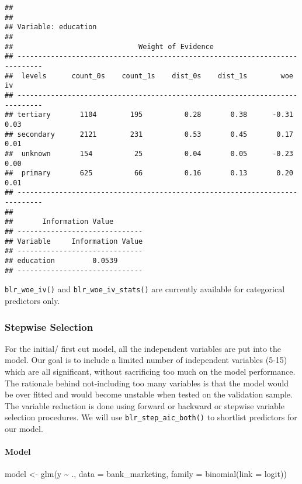 \documentclass[
]{article}
\newenvironment{Shaded}{\begin{snugshade}}{\end{snugshade}}
\newcommand{\AttributeTok}[1]{\textcolor[rgb]{0.77,0.63,0.00}{#1}}
\newcommand{\FunctionTok}[1]{\textcolor[rgb]{0.00,0.00,0.00}{#1}}
\newcommand{\NormalTok}[1]{#1}
\newcommand{\OtherTok}[1]{\textcolor[rgb]{0.56,0.35,0.01}{#1}}
\newcommand{\SpecialCharTok}[1]{\textcolor[rgb]{0.00,0.00,0.00}{#1}}
\newcommand{\StringTok}[1]{\textcolor[rgb]{0.31,0.60,0.02}{#1}}
\begin{document}
\begin{verbatim}
## 
## 
## Variable: education
## 
##                              Weight of Evidence                              
## ----------------------------------------------------------------------------
##  levels      count_0s    count_1s    dist_0s    dist_1s        woe      iv   
## ----------------------------------------------------------------------------
## tertiary       1104        195          0.28       0.38      -0.31     0.03  
## secondary      2121        231          0.53       0.45       0.17     0.01  
##  unknown       154          25          0.04       0.05      -0.23     0.00  
##  primary       625          66          0.16       0.13       0.20     0.01  
## ----------------------------------------------------------------------------
## 
##       Information Value        
## ------------------------------
## Variable     Information Value 
## ------------------------------
## education         0.0539       
## ------------------------------
\end{verbatim}

\texttt{blr\_woe\_iv()} and \texttt{blr\_woe\_iv\_stats()} are currently
available for categorical predictors only.

\hypertarget{stepwise-selection}{%
\subsubsection{Stepwise Selection}\label{stepwise-selection}}

For the initial/ first cut model, all the independent variables are put
into the model. Our goal is to include a limited number of independent
variables (5-15) which are all significant, without sacrificing too much
on the model performance. The rationale behind not-including too many
variables is that the model would be over fitted and would become
unstable when tested on the validation sample. The variable reduction is
done using forward or backward or stepwise variable selection
procedures. We will use \texttt{blr\_step\_aic\_both()} to shortlist
predictors for our model.

\hypertarget{model}{%
\paragraph{Model}\label{model}}

\begin{Shaded}
\begin{Highlighting}[]
\NormalTok{model }\OtherTok{\textless{}{-}} \FunctionTok{glm}\NormalTok{(y }\SpecialCharTok{\textasciitilde{}}\NormalTok{ ., }\AttributeTok{data =}\NormalTok{ bank\_marketing, }\AttributeTok{family =} \FunctionTok{binomial}\NormalTok{(}\AttributeTok{link =} \StringTok{\textquotesingle{}logit\textquotesingle{}}\NormalTok{))}
\end{Highlighting}
\end{Shaded}
\end{document}
